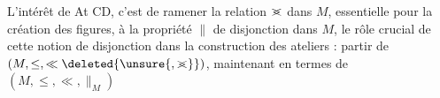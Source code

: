 L'intérêt de At CD, c'est de ramener la relation $\mathrel{>\mkern-12mu<}$ dans $M$, essentielle pour la création des figures, à la propriété $\parallel$ de disjonction dans $M$,   le rôle crucial de cette notion de disjonction dans la construction des ateliers : partir de $(M,\leq,\ll\deleted{\unsure{,\mathrel{>\mkern-12mu<}}})$,   maintenant en termes de $(M,\leq,\ll,\parallel_M)$
